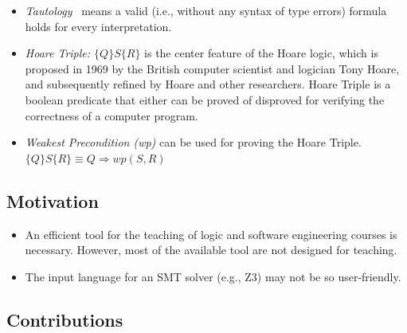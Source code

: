 \documentclass[a0,landscape]{a0poster}
\newcommand{\highlight}[1]{{\color{Fuchsia} \textit{#1}}}
\begin{document}
\begin{multicols}{4}
\begin{itemize}
	
\item \highlight{Tautology}~  means a valid (i.e., without any syntax of type errors) formula holds for every interpretation.
\item \highlight{Hoare Triple: $\{Q\} S \{R\}$} is the center feature of the Hoare logic, which is proposed in 1969 by the British computer scientist and logician Tony Hoare, and subsequently refined by Hoare and other researchers. Hoare Triple is a boolean predicate that either can be proved of disproved for verifying the correctness of a computer program.
\item \highlight{Weakest Precondition (wp)} can be used for proving the Hoare Triple. $\{Q\} S \{R\}  \equiv Q \Rightarrow wp(S, R)$

\end{itemize}


{\color{Blue} \subsection*{Motivation}}

\begin{itemize}
\item An efficient tool for the teaching of logic and software engineering courses is necessary. However, most of the available tool are not designed for teaching. 
\item The input language for an SMT solver (e.g., Z3) may not be so user-friendly.
\end{itemize}


{ \color{BrickRed}
\subsection*{Contributions}

}
\end{multicols}
\end{document}
